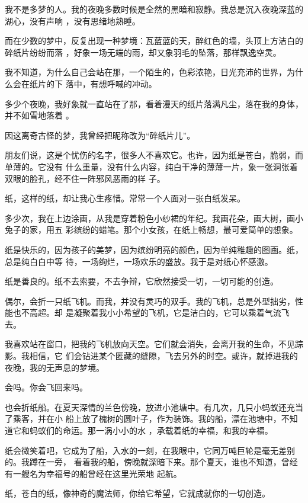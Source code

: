 \documentclass[12pt,a4paper]{article}
\begin{document}

		我不是多梦的人。我的夜晚多数时候是全然的黑暗和寂静。我总是沉入夜晚深蓝的湖心，没有声响
	，没有思绪地熟睡。


		而在少数的梦中，反复出现一种梦境：瓦蓝蓝的天，醉红色的墙，头顶上方洁白的碎纸片纷纷而落
	，好象一场无端的雨，却又象羽毛的坠落，那样飘逸空灵。

		我不知道，为什么自己会站在那，一个陌生的，色彩浓艳，日光充沛的世界，为什么会在纸片的下
	落中，有想呼喊的冲动。

		多少个夜晚，我好象就一直站在了那，看着漫天的纸片落满凡尘，落在我的身体，并不如雪地落着
	。

		因这离奇古怪的梦，我曾经把昵称改为“碎纸片儿”。

		朋友们说，这是个忧伤的名字，很多人不喜欢它。也许，因为纸是苍白，脆弱，而单薄的。它没有
	什么重量，没有什么内容，纯白干净的薄薄一片，象一张洞张着双眼的脸孔，经不住一阵邪风恶雨的样
	子。

		纸，这样的纸，却让我心生疼惜。常常一个人面对一张白纸发呆。

		多少次，我在上边涂画，从我是穿着粉色小纱裙的年纪。我画花朵，画大树，画小兔子的家，用五
	彩缤纷的蜡笔。那个小女孩，在纸上畅想，最可爱简单的想象。

		纸是快乐的，因为孩子的美梦，因为缤纷明亮的颜色，因为单纯稚趣的图画。纸，总是纯白白中等
	待，一场绚烂，一场欢乐的盛放。我于是对纸心怀感激。


		纸是善良的。纸不去索要，不去争辩，它欣然接受一切，一切可能的创造。

		偶尔，会折一只纸飞机。而我，并没有灵巧的双手。我的飞机，总是外型拙劣，性能也不高超。却
	是凝聚着我小小希望的飞机，它是洁白的，它可以乘着气流飞去。

		我喜欢站在窗口，把我的飞机放向天空。它们就会消失，会离开我的生命，不见踪影。我相信，它
	们会钻进某个匿藏的缝隙，飞去另外的时空。或许，就掉进我的夜晚，我的无声息的梦境。

		会吗。你会飞回来吗。

		也会折纸船。在夏天深情的兰色傍晚，放进小池塘中。有几次，几只小蚂蚁还充当了乘客，并在小
	船上放了槐树的圆叶子，作为装饰。我的船，漂在池塘中，不知道它和蚂蚁们的命运。那一涡小小的水
	，承载着纸的幸福，和我的幸福。

		纸会微笑着吧，它成为了船，入水的一刻，在我眼中，它同万吨巨轮是毫无差别的。我蹲在一旁，
	看着我的船，傍晚就深暗下来。那个夏天，谁也不知道，曾经有一艘名为幸福号的船曾经在这里光荣地
	起航。


		纸，苍白的纸，像神奇的魔法师，你给它希望，它就成就你的一切创造。
\end{document}
